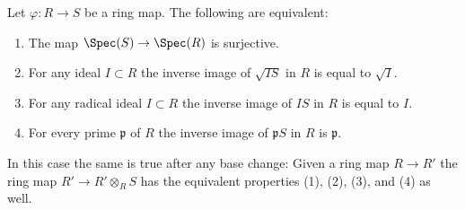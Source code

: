 \begin{lemma}
\label{editorial-source-lemma-surjective-spec-radical-ideal}
Let $\varphi : R \to S$ be a ring map.
The following are equivalent:
\begin{enumerate}
\item The map $\Spec(S) \to \Spec(R)$ is surjective.
\item For any ideal $I \subset R$
the inverse image of $\sqrt{IS}$ in $R$ is equal to $\sqrt{I}$.
\item For any radical ideal $I \subset R$ the inverse image
of $IS$ in $R$ is equal to $I$.
\item For every prime $\mathfrak p$ of $R$ the inverse
image of $\mathfrak p S$ in $R$ is $\mathfrak p$.
\end{enumerate}
In this case the same is true after any base change: Given a ring map
$R \to R'$ the ring map $R' \to R' \otimes_R S$ has the equivalent
properties (1), (2), (3), and (4) as well.
\end{lemma}

